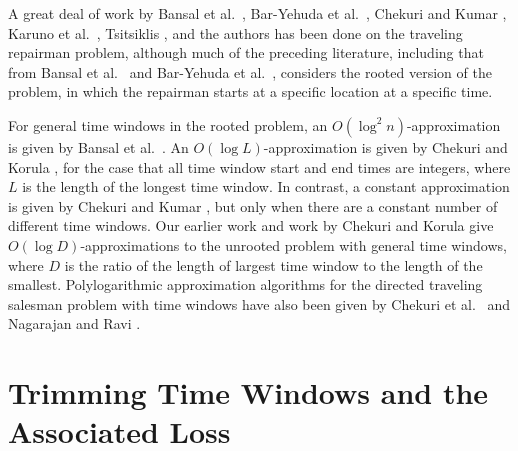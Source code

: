 \documentclass[11pt]{article}
\begin{document}
A great deal of work by Bansal et al.~\cite{Bansal}, Bar-Yehuda et al.~\cite{Bar-Yehuda}, Chekuri and Kumar \cite{Chekuri}, Karuno et al.~\cite{Karuno3}, Tsitsiklis \cite{Tsitsiklis}, and the authors \cite{Frederickson6} has been done on the traveling repairman problem, although much of the preceding literature, including that from Bansal et al.~\cite{Bansal} and  Bar-Yehuda et al.~\cite{Bar-Yehuda}, considers the rooted version of the problem, in which the repairman starts at a specific location at a specific time. 

For general time windows in the rooted problem, an $O(\log^2 n)$-approximation is given by Bansal et al.~\cite{Bansal}.  An $O(\log L)$-approximation is given by Chekuri and Korula \cite{Chekuri3}, for the case that all time window start and end times are integers, where $L$ is the length of the longest time window.  In contrast, a constant approximation is given by Chekuri and Kumar \cite{Chekuri},
but only when there are a constant number of different time windows.  Our earlier work \cite{Frederickson6} and work by Chekuri and Korula \cite{Chekuri3} give $O(\log D)$-approximations to the unrooted problem with general time windows, where $D$ is the ratio of the length of largest time window to the length of the smallest.  Polylogarithmic approximation algorithms for the directed traveling salesman problem with time windows have also been given by Chekuri et al.~\cite{Chekuri2} and Nagarajan and Ravi \cite{Nagarajan2}.

\section{Trimming Time Windows and the Associated Loss}
\label{section:trimming}
\end{document}
